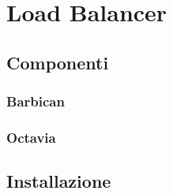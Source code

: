 \section{Load Balancer}

\subsection{Componenti}

\subsubsection{Barbican}

\subsubsection{Octavia}

\subsection{Installazione}